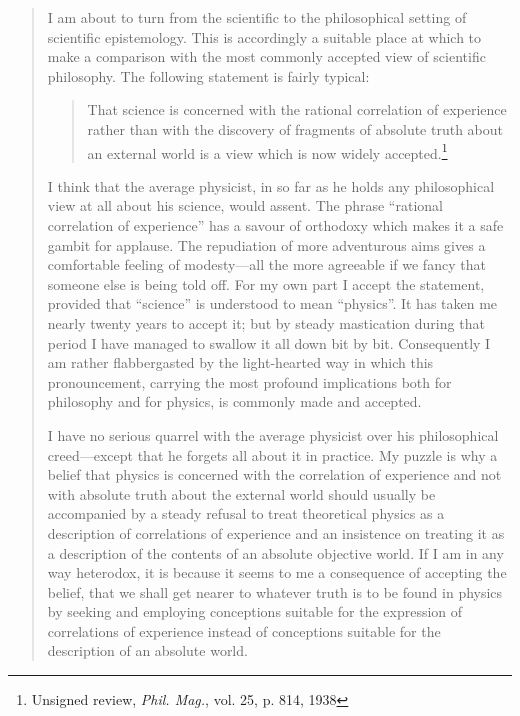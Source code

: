 \begin{quote}
    I am about to turn from the scientific to the philosophical setting of scientific epistemology.  This is accordingly a suitable place at which to make a comparison with the most commonly accepted view of scientific philosophy.  The following statement is fairly typical:

    \begin{quote}
        That science is concerned with the rational correlation of experience rather than with the discovery of fragments of absolute truth about an external world is a view which is now widely accepted.\footnote{Unsigned review, \emph{Phil. Mag.}, vol. 25, p. 814, 1938}
    \end{quote}

    I think that the average physicist, in so far as he holds any philosophical view at all about his science, would assent.  The phrase ``rational correlation of experience'' has a savour of orthodoxy which makes it a safe gambit for applause.  The repudiation of more adventurous aims gives a comfortable feeling of modesty---all the more agreeable if we fancy that someone else is being told off.  For my own part I accept the statement, provided that ``science'' is understood to mean ``physics''.  It has taken me nearly twenty years to accept it; but by steady mastication during that period I have managed to swallow it all down bit by bit.  Consequently I am rather flabbergasted by the light-hearted way in which this pronouncement, carrying the most profound implications both for philosophy and for physics, is commonly made and accepted.  

    I have no serious quarrel with the average physicist over his philosophical creed---except that he forgets all about it in practice.  My puzzle is why a belief that physics is concerned with the correlation of experience and not with absolute truth about the external world should usually be accompanied by a steady refusal to treat theoretical physics as a description of correlations of experience and an insistence on treating it as a description of the contents of an absolute objective world.  If I am in any way heterodox, it is because it seems to me a consequence of accepting the belief, that we shall get nearer to whatever truth is to be found in physics by seeking and employing conceptions suitable for the expression of correlations of experience instead of conceptions suitable for the description of an absolute world. 


\end{quote}
